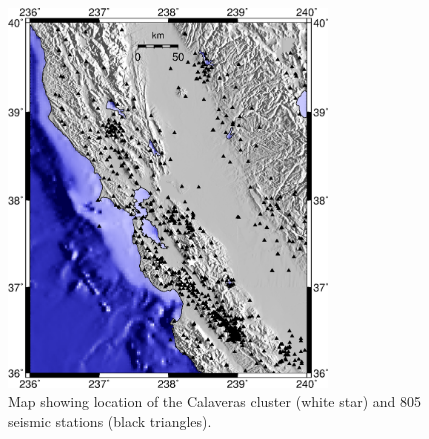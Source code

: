 \documentclass[extra, onecolumn, doublespacing]{gji}
\begin{document}
\begin{figure}
\noindent\includegraphics[width=20pc]{Figure5.eps} \caption{Map
showing location of the Calaveras cluster (white star) and 805
seismic stations (black triangles).}
\label{fig:-eqopti-California-Calaveras}
\end{figure}


\end{document}
